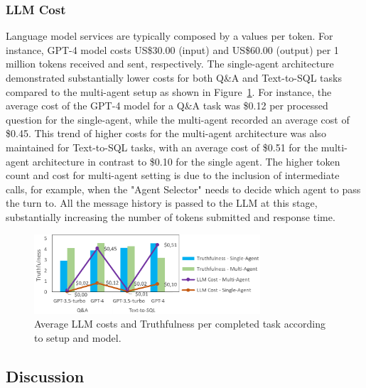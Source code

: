             \subsubsection{LLM Cost} 
                Language model services are typically composed by a values per token. For instance, GPT-4 model costs US\$30.00 (input) and US\$60.00 (output) per 1 million tokens received and sent, respectively.        
                The single-agent architecture demonstrated substantially lower costs for both Q\&A and Text-to-SQL tasks compared to the multi-agent setup as shown in Figure~\ref{fig:truthfulness_vs_cost_vs_config_model}. For instance, the average cost of the GPT-4 model \citep{OpenAI2023} for a Q\&A task was \$0.12 per processed question for the single-agent, while the multi-agent recorded an average cost of \$0.45. This trend of higher costs for the multi-agent architecture was also maintained for Text-to-SQL tasks, with an average cost of \$0.51 for the multi-agent architecture in contrast to \$0.10 for the single agent.
                The higher token count and cost for multi-agent setting is due to the inclusion of intermediate calls, for example, when the "Agent Selector" needs to decide which agent to pass the turn to. All the message history is passed to the LLM at this stage, substantially increasing the number of tokens submitted and response time.


                \begin{figure}[h]
                    \centering              
                        \includegraphics[width=0.75\textwidth]{images/truthfulness_vs_cost_vs_config_model.png}
                    \caption{Average LLM costs and Truthfulness per completed task according to setup and model.}
                    \label{fig:truthfulness_vs_cost_vs_config_model}
                \end{figure}
                
                

        \subsection{Discussion} %

